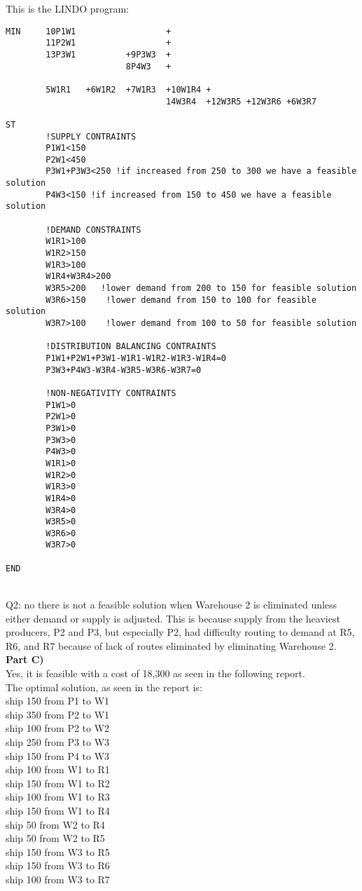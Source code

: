 \documentclass[12pt]{report}
\begin{document}
This is the LINDO program:\\
\begin{verbatim}
MIN     10P1W1                  +
        11P2W1                  +
        13P3W1          +9P3W3  +
                        8P4W3   +
        
        5W1R1   +6W1R2  +7W1R3  +10W1R4 +
                                14W3R4  +12W3R5 +12W3R6 +6W3R7

ST
        !SUPPLY CONTRAINTS
        P1W1<150
        P2W1<450
        P3W1+P3W3<250 !if increased from 250 to 300 we have a feasible solution
        P4W3<150 !if increased from 150 to 450 we have a feasible solution

        !DEMAND CONSTRAINTS
        W1R1>100
        W1R2>150
        W1R3>100
        W1R4+W3R4>200
        W3R5>200   !lower demand from 200 to 150 for feasible solution
        W3R6>150    !lower demand from 150 to 100 for feasible solution
        W3R7>100    !lower demand from 100 to 50 for feasible solution  

        !DISTRIBUTION BALANCING CONTRAINTS
        P1W1+P2W1+P3W1-W1R1-W1R2-W1R3-W1R4=0
        P3W3+P4W3-W3R4-W3R5-W3R6-W3R7=0

        !NON-NEGATIVITY CONTRAINTS
        P1W1>0
        P2W1>0
        P3W1>0
        P3W3>0
        P4W3>0
        W1R1>0
        W1R2>0
        W1R3>0
        W1R4>0
        W3R4>0
        W3R5>0
        W3R6>0
        W3R7>0

END
\end{verbatim}

\\
Q2: no there is not a feasible solution when Warehouse 2 is eliminated unless either demand or supply is adjusted.  This is because 
supply from the heaviest producers, P2 and P3, but especially P2, had difficulty routing to demand at R5, R6, and R7 because of lack
of routes eliminated by eliminating Warehouse 2.\\

\textbf{Part C)}\\
Yes, it is feasible with a cost of 18,300 as seen in the following report.\\
The optimal solution, as seen in the report is:\\
ship 150 from P1 to W1\\
ship 350 from P2 to W1\\
ship 100 from P2 to W2\\
ship 250 from P3 to W3\\
ship 150 from P4 to W3\\
ship 100 from W1 to R1\\
ship 150 from W1 to R2\\
ship 100 from W1 to R3\\
ship 150 from W1 to R4\\
ship 50 from W2 to R4\\
ship 50 from W2 to R5\\
ship 150 from W3 to R5\\
ship 150 from W3 to R6\\
ship 100 from W3 to R7\\
\end{document}
